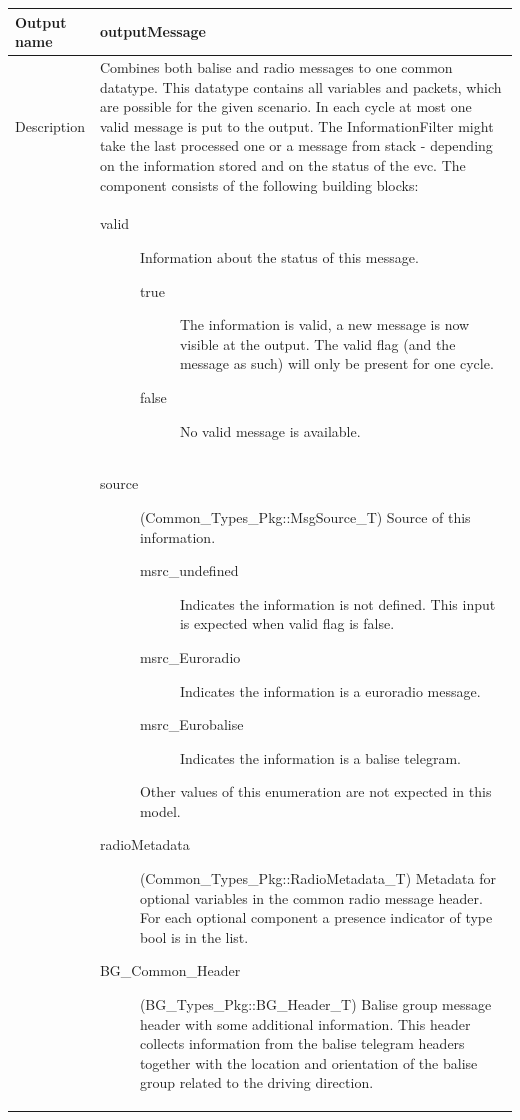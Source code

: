 \begin{longtable}{p{}p{}}
\toprule
Output name				& outputMessage \\
\midrule
Description				& Combines both balise and radio messages to one common datatype. This datatype contains all variables and packets, which are possible for the given scenario. In each cycle at most one valid message is put to the output. The InformationFilter might take the last processed one or a message from stack - depending on the information stored and on the status of the evc. The component consists of the following building blocks:\\
&
\begin{description}
\item[valid] Information about the status of this message.
\begin{description}
\item[true] The information is valid, a new message is now visible at the output. The valid flag (and the message as such) will only be present for one cycle.
\item[false] No valid message is available.
\end{description}
\end{description}\\
&
\begin{description}
\item[source](Common\_Types\_Pkg::MsgSource\_T) Source of this information. 
\begin{description}
\item[msrc\_undefined] Indicates the information is not defined. This input is expected when valid flag is false.
\item[msrc\_Euroradio] Indicates the information is a euroradio message.
\item[msrc\_Eurobalise] Indicates the information is a balise telegram.
\end{description}
Other values of this enumeration are not expected in this model.
\item[radioMetadata](Common\_Types\_Pkg::RadioMetadata\_T) Metadata for optional variables in the common radio message header. For each optional component a presence indicator of type bool is in the list.  
\item[BG\_Common\_Header](BG\_Types\_Pkg::BG\_Header\_T) Balise group message header with some additional information. This header collects information from the balise telegram headers together with the location and orientation of the balise group related to the driving direction.


\end{description}
\end{longtable}
